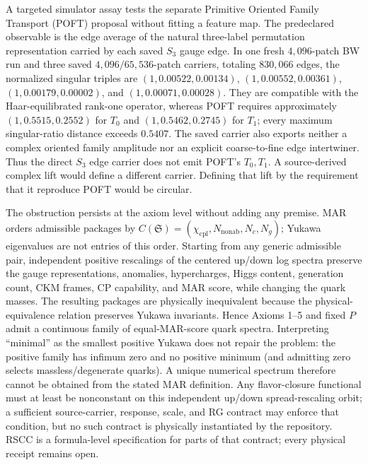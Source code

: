 \documentclass[11pt]{article}
\begin{document}
A targeted simulator assay tests the separate Primitive Oriented Family Transport (POFT) proposal
without fitting a feature map.  The predeclared observable is the edge average of the natural
three-label permutation representation carried by each saved $S_3$ gauge edge.  In one fresh
$4{,}096$-patch BW run and three saved $4{,}096/65{,}536$-patch carriers, totaling
$830{,}066$ edges, the normalized singular triples are
$(1,0.00522,0.00134)$, $(1,0.00552,0.00361)$,
$(1,0.00179,0.00002)$, and $(1,0.00071,0.00028)$.
They are compatible with the Haar-equilibrated rank-one operator, whereas POFT requires
approximately $(1,0.5515,0.2552)$ for $T_0$ and
$(1,0.5462,0.2745)$ for $T_1$; every maximum singular-ratio distance exceeds $0.5407$.
The saved carrier also exports neither a complex oriented family amplitude nor an explicit
coarse-to-fine edge intertwiner.  Thus the direct $S_3$ edge carrier does not emit POFT's
$T_0,T_1$.  A source-derived complex lift would define a different carrier. Defining that lift by
the requirement that it reproduce POFT would be circular.

The obstruction persists at the axiom level without adding any premise.  MAR orders admissible
packages by \(C(\mathfrak S)=(\chi_{\mathrm{cpl}},N_{\mathrm{nonab}},N_c,N_g)\); Yukawa
eigenvalues are not entries of this order.  Starting from any generic admissible pair, independent
positive rescalings of the centered up/down log spectra preserve the gauge representations,
anomalies, hypercharges, Higgs content, generation count, CKM frames, CP capability, and MAR score,
while changing the quark masses.  The resulting packages are physically inequivalent because the
physical-equivalence relation preserves Yukawa invariants.  Hence Axioms 1--5 and fixed \(P\) admit
a continuous family of equal-MAR-score quark spectra.  Interpreting ``minimal'' as the smallest
positive Yukawa does not repair the problem: the positive family has infimum zero and no positive
minimum (and admitting zero selects massless/degenerate quarks).  A unique numerical spectrum
therefore cannot be obtained from the stated MAR definition. Any flavor-closure functional
must at least be nonconstant on this independent up/down spread-rescaling orbit; a sufficient
source-carrier, response, scale, and RG contract may enforce that condition, but no such contract
is physically instantiated by the repository. RSCC is a formula-level specification for parts of
that contract; every physical receipt remains open.
\end{document}
